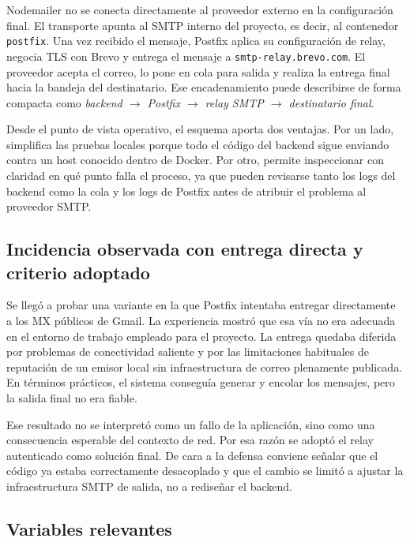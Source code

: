 \documentclass[11pt, a4paper]{article}
\begin{document}
Nodemailer no se conecta directamente al proveedor externo en la configuración final. El transporte apunta al SMTP interno del proyecto, es decir, al contenedor \texttt{postfix}. Una vez recibido el mensaje, Postfix aplica su configuración de relay, negocia TLS con Brevo y entrega el mensaje a \texttt{smtp-relay.brevo.com}. El proveedor acepta el correo, lo pone en cola para salida y realiza la entrega final hacia la bandeja del destinatario. Ese encadenamiento puede describirse de forma compacta como \textit{backend $\rightarrow$ Postfix $\rightarrow$ relay SMTP $\rightarrow$ destinatario final}.

Desde el punto de vista operativo, el esquema aporta dos ventajas. Por un lado, simplifica las pruebas locales porque todo el código del backend sigue enviando contra un host conocido dentro de Docker. Por otro, permite inspeccionar con claridad en qué punto falla el proceso, ya que pueden revisarse tanto los logs del backend como la cola y los logs de Postfix antes de atribuir el problema al proveedor SMTP.

\subsection{Incidencia observada con entrega directa y criterio adoptado}

Se llegó a probar una variante en la que Postfix intentaba entregar directamente a los MX públicos de Gmail. La experiencia mostró que esa vía no era adecuada en el entorno de trabajo empleado para el proyecto. La entrega quedaba diferida por problemas de conectividad saliente y por las limitaciones habituales de reputación de un emisor local sin infraestructura de correo plenamente publicada. En términos prácticos, el sistema conseguía generar y encolar los mensajes, pero la salida final no era fiable.

Ese resultado no se interpretó como un fallo de la aplicación, sino como una consecuencia esperable del contexto de red. Por esa razón se adoptó el relay autenticado como solución final. De cara a la defensa conviene señalar que el código ya estaba correctamente desacoplado y que el cambio se limitó a ajustar la infraestructura SMTP de salida, no a rediseñar el backend.

\subsection{Variables relevantes}
\end{document}
